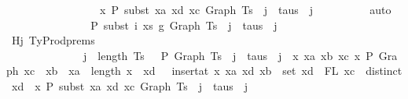 \begin{isabellebody}
\ \ \ \ \ \ \ \ \ \ \ \ \ \ \ \ \ x\ {\isasymturnstile}{\isacharbraceleft}{\kern0pt}P{\isacharbraceright}{\kern0pt}\ subst\ xa\ xd\ xc\ {\isacharparenleft}{\kern0pt}Graph\ {\isacharparenleft}{\kern0pt}Ts\ {\isacharbang}{\kern0pt}\ j{\isacharparenright}{\kern0pt}{\isacharparenright}{\kern0pt}\ {\isacharcolon}{\kern0pt}\ taus\ {\isacharbang}{\kern0pt}\ j{\isacharparenright}{\kern0pt}{\isachardoublequoteclose}\isanewline
\ \ \ \ \ \ \ \ \isamarkupfalse%
\ auto\isanewline
\isanewline
\ \ \ \ \ \ \isanewline
\ \ \ \ \ \ \isamarkupfalse%
\ {\isachardoublequoteopen}{\isasymGamma}{}\ {\isasymturnstile}{\isacharbraceleft}{\kern0pt}P{\isacharbraceright}{\kern0pt}\ subst\ i\ xs\ g{}\ {\isacharparenleft}{\kern0pt}Graph\ {\isacharparenleft}{\kern0pt}Ts\ {\isacharbang}{\kern0pt}\ j{\isacharparenright}{\kern0pt}{\isacharparenright}{\kern0pt}\ {\isacharcolon}{\kern0pt}\ taus\ {\isacharbang}{\kern0pt}\ j{\isachardoublequoteclose}\isanewline
\ \ \ \ \ \ \ \ \ \isamarkupfalse%
\ Hj\ TyProd{\isachardot}{\kern0pt}prems{\isacharparenleft}{\kern0pt}{}{\isacharcomma}{\kern0pt}{}{\isacharcomma}{\kern0pt}{}{\isacharcomma}{\kern0pt}{}{\isacharcomma}{\kern0pt}{}{\isacharparenright}{\kern0pt}\isanewline
\ \ \ \ \ \ \ \ \ \ \ \ \ \ {\isacartoucheopen}j\ {\isacharless}{\kern0pt}\ length\ Ts\ {\isasymLongrightarrow}\ {\isasymGamma}\ {\isasymturnstile}{\isacharbraceleft}{\kern0pt}P{\isacharbraceright}{\kern0pt}\ Graph\ {\isacharparenleft}{\kern0pt}Ts\ {\isacharbang}{\kern0pt}\ j{\isacharparenright}{\kern0pt}\ {\isacharcolon}{\kern0pt}\ taus\ {\isacharbang}{\kern0pt}\ j\ {\isasymand}\ {\isacharparenleft}{\kern0pt}{\isasymforall}x\ xa\ xb\ xc{\isachardot}{\kern0pt}\ x\ {\isasymturnstile}{\isacharbraceleft}{\kern0pt}P{\isacharbraceright}{\kern0pt}\ Graph\ xc\ {\isacharcolon}{\kern0pt}\ xb\ {\isasymlongrightarrow}\ xa\ {\isasymle}\ length\ x\ {\isasymlongrightarrow}\ {\isacharparenleft}{\kern0pt}{\isasymforall}xd{\isachardot}{\kern0pt}\ {\isasymGamma}\ {\isacharequal}{\kern0pt}\ insert{\isacharunderscore}{\kern0pt}at\ x\ xa\ {\isacharparenleft}{\kern0pt}xd{\isacharcomma}{\kern0pt}\ xb{\isacharparenright}{\kern0pt}\ {\isasymlongrightarrow}\ set\ xd\ {\isacharequal}{\kern0pt}\ FL\ xc\ {\isasymlongrightarrow}\ distinct\ xd\ {\isasymlongrightarrow}\ x\ {\isasymturnstile}{\isacharbraceleft}{\kern0pt}P{\isacharbraceright}{\kern0pt}\ subst\ xa\ xd\ xc\ {\isacharparenleft}{\kern0pt}Graph\ {\isacharparenleft}{\kern0pt}Ts\ {\isacharbang}{\kern0pt}\ j{\isacharparenright}{\kern0pt}{\isacharparenright}{\kern0pt}\ {\isacharcolon}{\kern0pt}\ taus\ {\isacharbang}{\kern0pt}\ j{\isacharparenright}{\kern0pt}{\isacharparenright}{\kern0pt}{\isacartoucheclose}\isanewline

\end{isabellebody}
